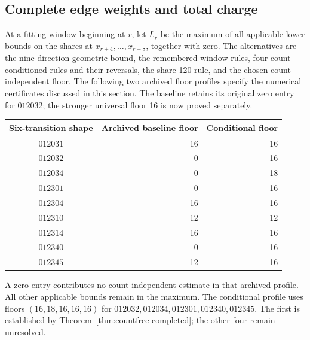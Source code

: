 \documentclass[11pt,a4paper]{article}
\theoremstyle{definition}
\theoremstyle{remark}
\begin{document}
\subsection{Complete edge weights and total charge}\label{sec:actual-weights}
At a fitting window beginning at $r$, let $L_r$ be the maximum of all
applicable lower bounds on the shares at $x_{r+4},\ldots,x_{r+8}$, together
with zero. The alternatives are the nine-direction geometric bound, the
remembered-window rules, four count-conditioned rules and their reversals,
the share-120 rule, and the chosen count-independent floor. The following
two archived floor profiles specify the numerical certificates discussed
in this section. The baseline retains its original zero entry for $012032$;
the stronger universal floor 16 is now proved separately.
\begin{center}\small
\begin{tabular}{c r r}
\toprule
Six-transition shape & Archived baseline floor & Conditional floor\\\midrule
$012031$ & 16 & 16\\
$012032$ & 0 & 16\\
$012034$ & 0 & 18\\
$012301$ & 0 & 16\\
$012304$ & 16 & 16\\
$012310$ & 12 & 12\\
$012314$ & 16 & 16\\
$012340$ & 0 & 16\\
$012345$ & 12 & 16\\\bottomrule
\end{tabular}
\end{center}
A zero entry contributes no count-independent estimate in that archived
profile. All other applicable bounds remain in the maximum. The conditional
profile uses floors $(16,18,16,16,16)$ for
$012032,012034,012301,012340,012345$. The first is established by
Theorem~\ref{thm:countfree-completed}; the other four remain unresolved.
\end{document}
